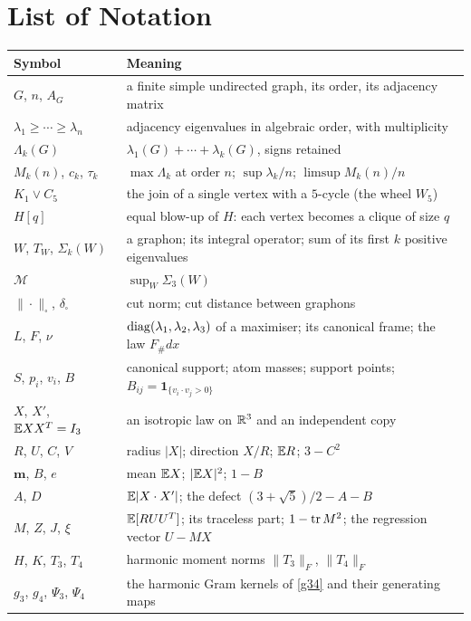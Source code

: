 \chapter*{List of Notation}
\singlespacing
\begin{longtable}{@{}p{} p{}@{}}
\endhead
\toprule
\textbf{Symbol} & \textbf{Meaning} \\
\midrule
$G$, $n$, $A_G$ & a finite simple undirected graph, its order, its adjacency matrix \\
$\lambda_1\ge\cdots\ge\lambda_n$ & adjacency eigenvalues in algebraic order, with multiplicity \\
$\Lambda_k(G)$ & $\lambda_1(G)+\cdots+\lambda_k(G)$, signs retained \\
$M_k(n)$, $c_k$, $\tau_k$ & $\max\Lambda_k$ at order $n$; $\sup\lambda_k/n$; $\limsup M_k(n)/n$ \\
$K_1\vee C_5$ & the join of a single vertex with a $5$-cycle (the wheel $W_5$) \\
$H[q]$ & equal blow-up of $H$: each vertex becomes a clique of size $q$ \\
$W$, $T_W$, $\Sigma_k(W)$ & a graphon; its integral operator; sum of its first $k$ positive eigenvalues \\
$\mathcal M$ & $\sup_W\Sigma_3(W)$ \\
$\|\cdot\|_\square$, $\delta_\square$ & cut norm; cut distance between graphons \\
$L$, $F$, $\nu$ & $\operatorname{diag}(\lambda_1,\lambda_2,\lambda_3)$ of a maximiser; its canonical frame; the law $F_\#dx$ \\
$S$, $p_i$, $v_i$, $B$ & canonical support; atom masses; support points; $B_{ij}=\mathbf1_{\{v_i\cdot v_j>0\}}$ \\
$X$, $X'$, $\mathbb E XX^T=I_3$ & an isotropic law on $\mathbb R^3$ and an independent copy \\
$R$, $U$, $C$, $V$ & radius $|X|$; direction $X/R$; $\mathbb E R$; $3-C^2$ \\
$\mathbf m$, $B$, $e$ & mean $\mathbb E X$; $|\mathbb E X|^2$; $1-B$ \\
$A$, $D$ & $\mathbb E|X\cdot X'|$; the defect $(3+\sqrt5)/2-A-B$ \\
$M$, $Z$, $J$, $\xi$ & $\mathbb E[RUU^T]$; its traceless part; $1-\operatorname{tr} M^2$; the regression vector $U-MX$ \\
$H$, $K$, $T_3$, $T_4$ & harmonic moment norms $\|T_3\|_F$, $\|T_4\|_F$ \\
$g_3$, $g_4$, $\Psi_3$, $\Psi_4$ & the harmonic Gram kernels of \eqref{g34} and their generating maps \\

\end{longtable}
